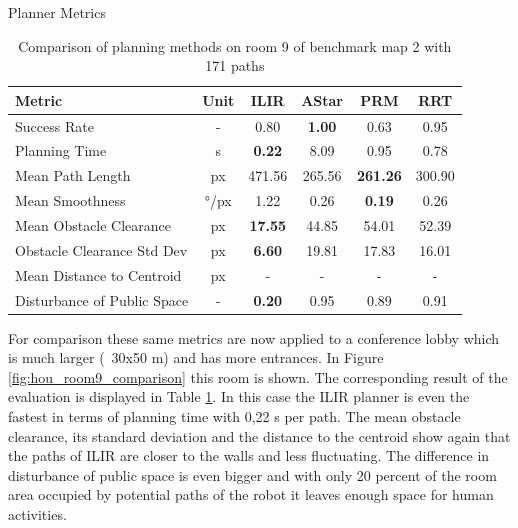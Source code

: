 \begin{table}[h]
\centering
\caption{Planner Metrics}
\label{tab:room9_results}
\begin{tabular}{lc|cccc}
\hline
\textbf{Metric}                    & \textbf{Unit} & \textbf{ILIR} & \textbf{AStar} & \textbf{PRM} & \textbf{RRT} \\
\hline
Success Rate                       & -             & 0.80          & \textbf{1.00}           & 0.63         & 0.95         \\
Planning Time                      & s             & \textbf{0.22}          & 8.09           & 0.95         & 0.78         \\
Mean Path Length                   & px            & 471.56        & 265.56         & \textbf{261.26}       & 300.90       \\
Mean Smoothness                    & °/px          & 1.22          & 0.26           & \textbf{0.19}         & 0.26         \\
Mean Obstacle Clearance            & px            & \textbf{17.55}        & 44.85          & 54.01        & 52.39        \\
Obstacle Clearance Std Dev         & px            & \textbf{6.60}          & 19.81          & 17.83        & 16.01        \\
Mean Distance to Centroid          & px            & -             & -              & -            & -            \\
Disturbance of Public Space        & -             & \textbf{0.20}          & 0.95           & 0.89         & 0.91         \\
\hline
\end{tabular}
\caption{Comparison of planning methods on room 9 of benchmark map 2 with 171 paths}
\end{table}

For comparison these same metrics are now applied to a conference lobby which is much larger (~30x50 m) and has more entrances. In Figure \ref{fig:hou_room9_comparison} this room is shown. The corresponding result of the evaluation is displayed in Table \ref{tab:room9_results}. In this case the ILIR planner is even the fastest in terms of planning time with 0,22 s per path. The mean obstacle clearance, its standard deviation and the distance to the centroid show again that the paths of ILIR are closer to the walls and less fluctuating. The difference in disturbance of public space is even bigger and with only 20 percent of the room area occupied by potential paths of the robot it leaves enough space for human activities. 

